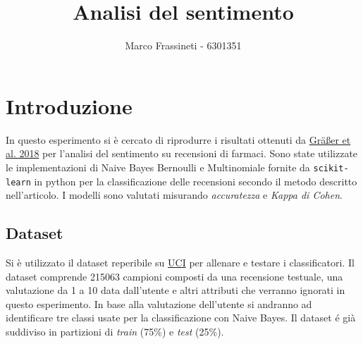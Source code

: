 \documentclass{article}
\title{Analisi del sentimento}
\author{Marco Frassineti - 6301351}
\date{}
\begin{document}
\maketitle

\tableofcontents


\section{Introduzione}
In questo esperimento si è cercato di riprodurre i risultati ottenuti da
\href{http://kdd.cs.ksu.edu/Publications/Student/kallumadi2018aspect.pdf}{Gräßer et al. 2018}
per l'analisi del sentimento su recensioni di farmaci. Sono state utilizzate le implementazioni
di Naive Bayes Bernoulli e Multinomiale fornite da \texttt{scikit-learn} in python
per la classificazione delle recensioni secondo il metodo descritto nell'articolo.
I modelli sono valutati misurando \textit{accuratezza} e \textit{Kappa di Cohen}.

\subsection{Dataset}
Si è utilizzato il dataset reperibile su
\href{https://archive.ics.uci.edu/ml/datasets/Drug+Review+Dataset+%28Drugs.com%29}{UCI}
per allenare e testare i classificatori. Il dataset comprende 215063 campioni composti da
una recensione testuale, una valutazione da 1 a 10 data dall'utente e altri attributi che
verranno ignorati in questo esperimento.
In base alla valutazione dell'utente si andranno ad identificare tre classi usate per
la classificazione con Naive Bayes.
Il dataset é già suddiviso in partizioni di \textit{train} (75\%) e \textit{test} (25\%).
\end{document}
